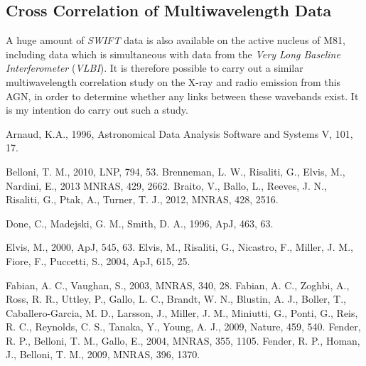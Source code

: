 \documentclass[letters,useAMS,usenatbib]{samnote}
\begin{document}
\subsection{Cross Correlation of Multiwavelength Data}

 A huge amount of {\it SWIFT} data is also available on the active nucleus of M81, including data which is simultaneous with data from the {\it Very Long Baseline
Interferometer} ({\it VLBI}). It is therefore possible to carry out a similar multiwavelength correlation study on the X-ray and radio emission from this AGN, in order
to determine whether any links between these wavebands exist. It is my intention do carry out such a study. 



\begin{thebibliography}{99}

    
    
      Arnaud, K.A., 1996, Astronomical Data Analysis Software and Systems V, 101, 17.

     Belloni, T. M., 2010, LNP, 794, 53.
     Brenneman, L. W., Risaliti, G., Elvis, M., Nardini, E., 2013 MNRAS, 429, 2662.
     Braito, V., Ballo, L., Reeves, J. N., Risaliti, G., Ptak, A., Turner, T. J., 2012, MNRAS, 428, 2516.
    
     Done, C., Madejski, G. M., Smith, D. A., 1996, ApJ, 463, 63.
    
     Elvis, M., 2000, ApJ, 545, 63.
     Elvis, M., Risaliti, G., Nicastro, F., Miller, J. M., Fiore, F., Puccetti, S., 2004, ApJ, 615, 25.
    
     Fabian, A. C., Vaughan, S., 2003, MNRAS, 340, 28.
     Fabian, A. C., Zoghbi, A., Ross, R. R., Uttley, P., Gallo, L. C., Brandt, W. N., Blustin, A. J.,
    Boller, T.,  Caballero-Garcia, M. D., Larsson, J., Miller, J. M., Miniutti, G., Ponti, G., Reis, R. C., Reynolds, C. S., Tanaka, Y., Young, A. J., 2009, Nature, 459,
    540.
     Fender, R. P., Belloni, T. M., Gallo, E., 2004, MNRAS, 355, 1105.
     Fender, R. P., Homan, J., Belloni, T. M., 2009, MNRAS, 396, 1370.
        

\end{thebibliography}
\end{document}
